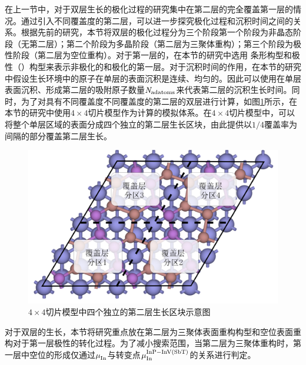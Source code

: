 在上一节中，对于双层生长的极化过程的研究集中在第二层的完全覆盖第一层的情况。通过引入不同覆盖度的第二层，可以进一步探究极化过程和沉积时间之间的关系。根据先前的研究，本节将双层的极化过程分为三个阶段\chinesecolon 第一个阶段为非晶态阶段（无第二层）；第二个阶段为多晶阶段（第二层为三聚体重构）；第三个阶段为极性阶段（第二层为空位重构）。对于第一层的，在本节的研究中选用 条形构型和极性（）构型来表示非极化的和极化的第一层。对于沉积时间的作用，在本节的研究中假设生长环境中的原子在单层的表面沉积是连续、均匀的。因此可以使用在单层表面沉积、形成第二层的吸附原子数量$\it N_{\rm adatoms} \it$来代表第二层的沉积生长时间。同时，为了对具有不同覆盖度不同覆盖度的第二层的双层进行计算，如图\ref{fig:IS_diagram_2Linsb_partial}所示，在本节的研究中使用$4 \times 4$切片模型作为计算的模拟体系。在$4 \times 4$切片模型中，可以将整个单层区域的表面分成四个独立的第二层生长区块，由此提供以$1/ 4$覆盖率为间隔的部分覆盖第二层生长。


\begin{figure}[ht]
    \includegraphics{pic/IS_diagram_2Linsb_partial.png}
    \caption{$4 \times 4$切片模型中四个独立的第二层生长区块示意图}
    \label{fig:IS_diagram_2Linsb_partial}
\end{figure}

对于双层的生长，本节将研究重点放在第二层为三聚体表面重构构型和空位表面重构对于第一层极性的转化过程。为了减小搜索范围，当第二层为三聚体重构时，第一层中空位的形成仅通过$\it \mu_{\rm In}^{\rm } \it$与转变点$\it \mu_{\rm In}^{\rm InP-InV\left(SbT\right)} \it$的关系进行判定。

